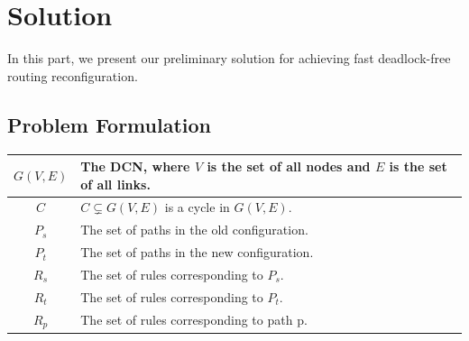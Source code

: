 \section{Solution}\label{sec:solution}

In this part, we present our preliminary solution for achieving fast deadlock-free routing reconfiguration.

\subsection{Problem Formulation}\label{subsec:formulation}

\begin{table}
\begin{tabularx}{0.48\textwidth}{ |c||X| } 
	\hline
	$G(V,E)$ & The DCN, where $V$ is the set of all nodes and $E$ is the set of all links. \\ 
	\hline
	$C$ & $C \subsetneq G(V,E)$ is a cycle in $G(V,E)$. \\ 
	\hline
	$P_s$ & The set of paths in the old configuration. \\
	\hline
	$P_t$ & The set of paths in the new configuration. \\
	\hline
	$R_s$ & The set of rules corresponding to $P_s$. \\
	\hline
	$R_t$ & The set of rules corresponding to $P_t$. \\
	\hline
	$R_p$ & The set of rules corresponding to path p. \\
	\hline


\end{tabularx}
\end{table}
